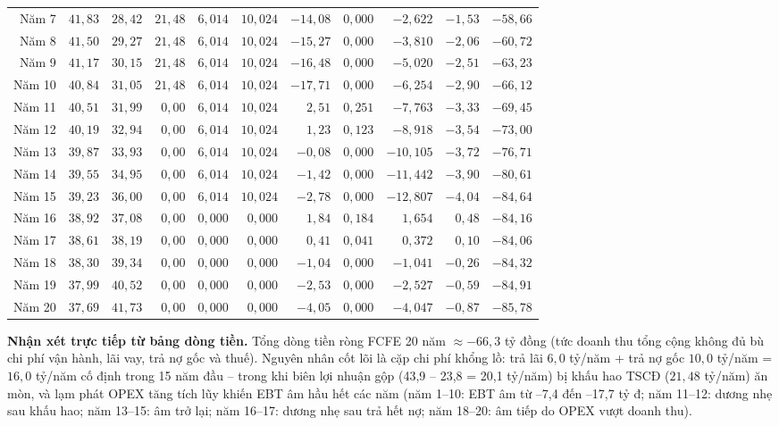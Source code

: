 \documentclass[../main.tex]{subfiles}
\begin{document}
\begin{table}[H]
{\begin{tabular}{r r r r r r r r r r r}
Năm 7 & $41{,}83$ & $28{,}42$ & $21{,}48$ & $6{,}014$ & $10{,}024$ & $-14{,}08$ & $0{,}000$ & $-2{,}622$ & $-1{,}53$ & $-58{,}66$ \\
Năm 8 & $41{,}50$ & $29{,}27$ & $21{,}48$ & $6{,}014$ & $10{,}024$ & $-15{,}27$ & $0{,}000$ & $-3{,}810$ & $-2{,}06$ & $-60{,}72$ \\
Năm 9 & $41{,}17$ & $30{,}15$ & $21{,}48$ & $6{,}014$ & $10{,}024$ & $-16{,}48$ & $0{,}000$ & $-5{,}020$ & $-2{,}51$ & $-63{,}23$ \\
Năm 10 & $40{,}84$ & $31{,}05$ & $21{,}48$ & $6{,}014$ & $10{,}024$ & $-17{,}71$ & $0{,}000$ & $-6{,}254$ & $-2{,}90$ & $-66{,}12$ \\
Năm 11 & $40{,}51$ & $31{,}99$ & $0{,}00$ & $6{,}014$ & $10{,}024$ & $2{,}51$ & $0{,}251$ & $-7{,}763$ & $-3{,}33$ & $-69{,}45$ \\
Năm 12 & $40{,}19$ & $32{,}94$ & $0{,}00$ & $6{,}014$ & $10{,}024$ & $1{,}23$ & $0{,}123$ & $-8{,}918$ & $-3{,}54$ & $-73{,}00$ \\
Năm 13 & $39{,}87$ & $33{,}93$ & $0{,}00$ & $6{,}014$ & $10{,}024$ & $-0{,}08$ & $0{,}000$ & $-10{,}105$ & $-3{,}72$ & $-76{,}71$ \\
Năm 14 & $39{,}55$ & $34{,}95$ & $0{,}00$ & $6{,}014$ & $10{,}024$ & $-1{,}42$ & $0{,}000$ & $-11{,}442$ & $-3{,}90$ & $-80{,}61$ \\
Năm 15 & $39{,}23$ & $36{,}00$ & $0{,}00$ & $6{,}014$ & $10{,}024$ & $-2{,}78$ & $0{,}000$ & $-12{,}807$ & $-4{,}04$ & $-84{,}64$ \\
Năm 16 & $38{,}92$ & $37{,}08$ & $0{,}00$ & $0{,}000$ & $0{,}000$ & $1{,}84$ & $0{,}184$ & $1{,}654$ & $0{,}48$ & $-84{,}16$ \\
Năm 17 & $38{,}61$ & $38{,}19$ & $0{,}00$ & $0{,}000$ & $0{,}000$ & $0{,}41$ & $0{,}041$ & $0{,}372$ & $0{,}10$ & $-84{,}06$ \\
Năm 18 & $38{,}30$ & $39{,}34$ & $0{,}00$ & $0{,}000$ & $0{,}000$ & $-1{,}04$ & $0{,}000$ & $-1{,}041$ & $-0{,}26$ & $-84{,}32$ \\
Năm 19 & $37{,}99$ & $40{,}52$ & $0{,}00$ & $0{,}000$ & $0{,}000$ & $-2{,}53$ & $0{,}000$ & $-2{,}527$ & $-0{,}59$ & $-84{,}91$ \\
Năm 20 & $37{,}69$ & $41{,}73$ & $0{,}00$ & $0{,}000$ & $0{,}000$ & $-4{,}05$ & $0{,}000$ & $-4{,}047$ & $-0{,}87$ & $-85{,}78$ \\
\midrule
\end{tabular}}
\end{table}

\textbf{Nhận xét trực tiếp từ bảng dòng tiền.} Tổng dòng tiền ròng FCFE 20 năm $\approx -66{,}3$ tỷ đồng (tức doanh thu tổng cộng không đủ bù chi phí vận hành, lãi vay, trả nợ gốc và thuế). Nguyên nhân cốt lõi là cặp chi phí khổng lồ: trả lãi $6{,}0$ tỷ/năm + trả nợ gốc $10{,}0$ tỷ/năm = $16{,}0$ tỷ/năm cố định trong 15 năm đầu -- trong khi biên lợi nhuận gộp (43,9 -- 23,8 = 20,1 tỷ/năm) bị khấu hao TSCĐ ($21{,}48$ tỷ/năm) ăn mòn, và lạm phát OPEX tăng tích lũy khiến EBT âm hầu hết các năm (năm 1--10: EBT âm từ --7,4 đến --17,7 tỷ đ; năm 11--12: dương nhẹ sau khấu hao; năm 13--15: âm trở lại; năm 16--17: dương nhẹ sau trả hết nợ; năm 18--20: âm tiếp do OPEX vượt doanh thu).
\end{document}

